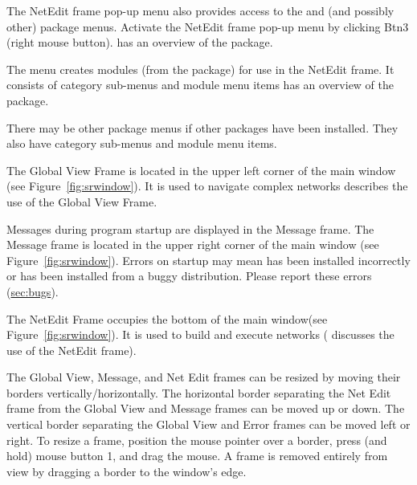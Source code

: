 \begin{description}
\begin{description}
    The NetEdit frame pop-up menu  also
    provides access to the \menu{\sr{}} and \menu{\biopse{}} (and
    possibly other) package menus. Activate the NetEdit frame pop-up
    menu by clicking Btn3 (right mouse button).  has an overview of the
    \sr{} package.
  \end{description}

  \begin{description}
     The  menu creates modules (from the
    \biopse package) for use in the NetEdit frame.  It consists of
    category sub-menus and module menu items  has an overview of the \biopse{}package.
  \end{description}

  \begin{description}
     There may be other
    package menus if other packages have been installed.  They also
    have category sub-menus and module menu items.
  \end{description}
  
   
  The Global View Frame is located in the
  upper left corner of the main window (see
  Figure~\ref{fig:srwindow}). It is used to navigate complex networks
   describes the use of the Global View Frame.
  
   
  Messages during program startup are displayed
  in the Message frame.  The Message frame is located in the upper right
  corner of the main window (see Figure~\ref{fig:srwindow}).  Errors on
  startup may mean \sr{} has been installed incorrectly or has
  been installed from a buggy distribution.  Please report these
  errors (\hyperref{report}{see Section~}{)}{sec:bugs}).
  
   
  The NetEdit Frame occupies the bottom of
  the main window(see Figure~\ref{fig:srwindow}).  It is used to build
  and execute networks (
  discusses the use of the NetEdit frame).

\end{description}

The Global View, Message, and Net Edit frames can be resized by moving
their borders vertically/horizontally.  The horizontal border separating
the Net Edit frame from the Global View and Message frames can be moved
up or down.  The vertical border separating the Global View and Error
frames can be moved left or right.  To resize a frame, position the
mouse pointer over a border, press (and hold) mouse button 1, and drag
the mouse.  A frame is removed entirely from view by dragging a border
to the window's edge.


